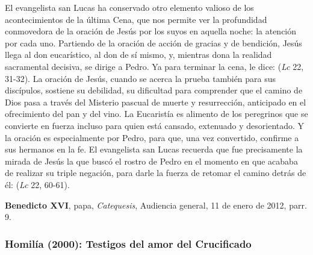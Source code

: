 \begin{patercite}
El evangelista san Lucas ha conservado otro elemento valioso de los acontecimientos de la última Cena, que nos permite ver la profundidad conmovedora de la oración de Jesús por los suyos en aquella noche: la atención por cada uno. Partiendo de la oración de acción de gracias y de bendición, Jesús llega al don eucarístico, al don de sí mismo, y, mientras dona la realidad sacramental decisiva, se dirige a Pedro. Ya para terminar la cena, le dice:  (\emph{Lc} 22, 31-32). La oración de Jesús, cuando se acerca la prueba también para sus discípulos, sostiene su debilidad, su dificultad para comprender que el camino de Dios pasa a través del Misterio pascual de muerte y resurrección, anticipado en el ofrecimiento del pan y del vino. La Eucaristía es alimento de los peregrinos que se convierte en fuerza incluso para quien está cansado, extenuado y desorientado. Y la oración es especialmente por Pedro, para que, una vez convertido, confirme a sus hermanos en la fe. El evangelista san Lucas recuerda que fue precisamente la mirada de Jesús la que buscó el rostro de Pedro en el momento en que acababa de realizar su triple negación, para darle la fuerza de retomar el camino detrás de él:  (\emph{Lc} 22, 60-61).

\textbf{Benedicto XVI}, papa, \textit{Catequesis}, Audiencia general, 11 de enero de 2012, parr. 9.
\end{patercite}

\newpage
\subsubsection{Homilía (2000): Testigos del amor del Crucificado}


